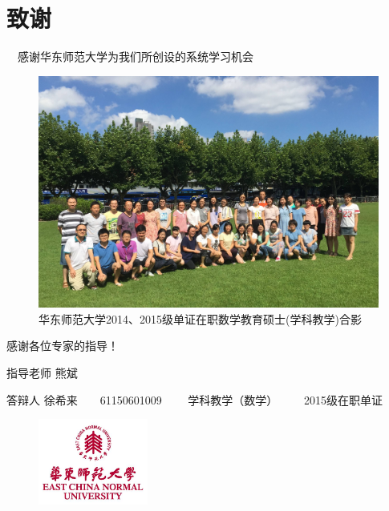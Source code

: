\documentclass[serif]{beamer}
\begin{document}
    \section{致谢}
    \begin{frame}{$ \quad $感谢华东师范大学为我们所创设的系统学习机会}
      \begin{figure}
      	\centering
      	\includegraphics[scale=0.08]{groupphoto.jpg}
      	\caption{\footnotesize{华东师范大学2014、2015级单证在职数学教育硕士(学科教学)合影}}
      \end{figure}   	
    \end{frame}
    
    \begin{frame}{\hspace{\fill}感谢各位专家的指导！}
       \begin{block}{指导老师}
    	熊斌
       \end{block}
       \pause
       \begin{block}{答辩人}
    	徐希来$ \qquad $61150601009$ \qquad $ 学科教学（数学）$ \qquad $ 2015级在职单证
       \end{block}
       \pause
       \begin{figure}[b]
    	\centering
    	\includegraphics[width=0.32\textwidth]{ECNUred01.jpg}
       \end{figure}
    \end{frame}
\end{document}

